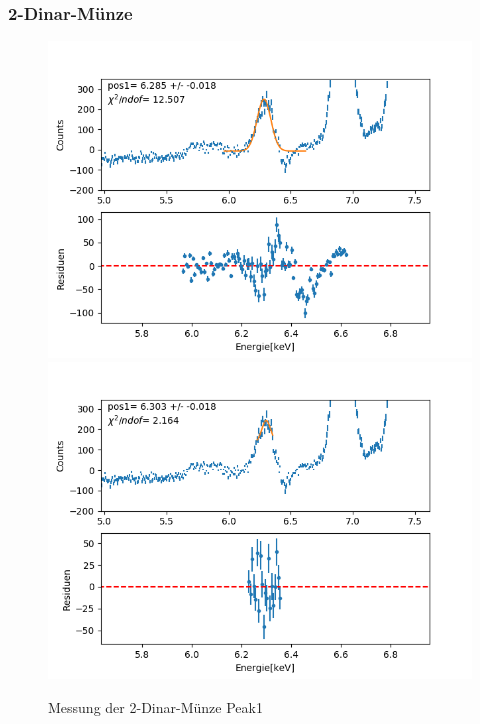 \documentclass[12pt,a4paper]{article}
\begin{document}
\subsubsection{2-Dinar-Münze}
\begin{figure}[H]
\centering
\includegraphics[scale=0.49]{Bilder/roentgen_spektren/denar/den1_1.png}
\includegraphics[scale=0.49]{Bilder/roentgen_spektren/denar/den1_2.png}
\caption{Messung der 2-Dinar-Münze Peak1}
\end{figure}
\end{document}
